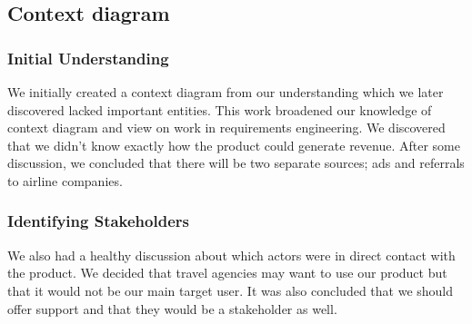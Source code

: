

\subsection{Context diagram}

\subsubsection{Initial Understanding}
We initially created a context diagram from our understanding which we later discovered lacked important entities. This work broadened our knowledge of context diagram and view on work in requirements engineering. We discovered that we didn’t know exactly how the product could generate revenue. After some discussion, we concluded that there will be two separate sources; ads and referrals to airline companies.

\subsubsection{Identifying Stakeholders}
We also had a healthy discussion about which actors were in direct contact with the product. We decided that travel agencies may want to use our product but that it would not be our main target user. It was also concluded that we should offer support and that they would be a stakeholder as well. 

